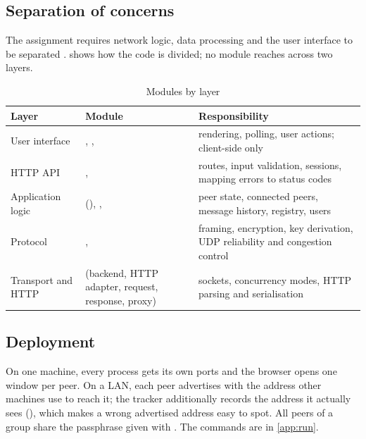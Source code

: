 \subsection{Separation of concerns}
The assignment requires network logic, data processing and the user interface to be separated
\cite{brief1}.  shows how the code is divided; no module reaches across two layers.

\begin{table}[H]\centering\footnotesize
\caption{Modules by layer}\label{tab:modules}
\begin{tabularx}{\textwidth}{@{}l >{\raggedright\arraybackslash}p{4.6cm} Y@{}}
\toprule
\textbf{Layer} & \textbf{Module} & \textbf{Responsibility} \\
\midrule
User interface & , ,  & rendering, polling, user actions; client-side only \\
HTTP API & ,  & routes, input validation, sessions, mapping errors to status codes \\
Application logic &  (), ,  & peer state, connected peers, message history, registry, users \\
Protocol & ,  & framing, encryption, key derivation, UDP reliability and congestion control \\
Transport and HTTP &  (backend, HTTP adapter, request, response, proxy) & sockets, concurrency modes, HTTP parsing and serialisation \\
\bottomrule
\end{tabularx}
\end{table}

\subsection{Deployment}
On one machine, every process gets its own ports and the browser opens one window per peer. On a LAN,
each peer advertises with  the address other machines use to reach it; the tracker
additionally records the address it actually sees (), which makes a wrong
advertised address easy to spot. All peers of a group share the passphrase given with
. The commands are in \cref{app:run}.
